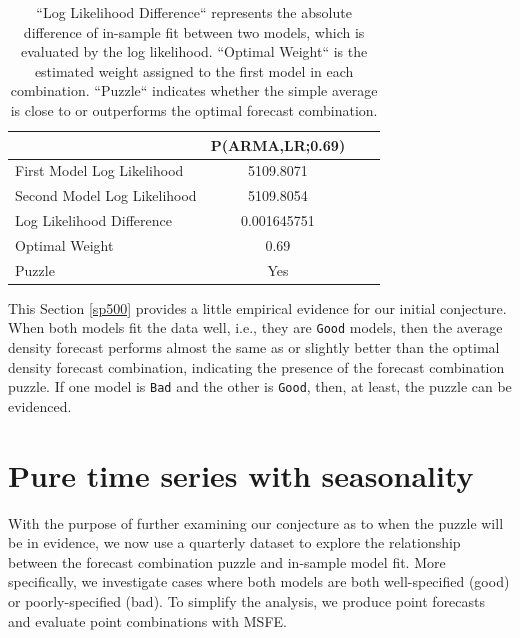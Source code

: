 \documentclass{monashthesis}
\begin{document}
\begin{table}[ht]
  \centering
    \begin{tabular}{l|ccc}
    \toprule
                                      &           P(ARMA,LR;0.69)  \\  
    \midrule
    First Model Log Likelihood        &               5109.8071               \\
    Second Model Log Likelihood       &               5109.8054               \\
    Log Likelihood Difference         &              0.001645751              \\
    Optimal Weight                    &                0.69                   \\
    Puzzle                            &                 Yes                   \\
    \bottomrule
    \end{tabular}
  \caption{``Log Likelihood Difference`` represents the absolute difference of in-sample fit between two models, which is evaluated by the log likelihood. ``Optimal Weight`` is the estimated weight assigned to the first model in each combination. ``Puzzle`` indicates whether the simple average is close to or outperforms the optimal forecast combination.}
  \label{tab:statfit}
\end{table}

This Section \ref{sp500} provides a little empirical evidence for our initial conjecture. When both models fit the data well, i.e., they are \texttt{Good} models, then the average density forecast performs almost the same as or slightly better than the optimal density forecast combination, indicating the presence of the forecast combination puzzle. If one model is \texttt{Bad} and the other is \texttt{Good}, then, at least, the puzzle can be evidenced.

\hypertarget{pure-time-series-with-seasonality}{%
\section{Pure time series with seasonality}\label{pure-time-series-with-seasonality}}

With the purpose of further examining our conjecture as to when the puzzle will be in evidence, we now use a quarterly dataset to explore the relationship between the forecast combination puzzle and in-sample model fit. More specifically, we investigate cases where both models are both well-specified (good) or poorly-specified (bad). To simplify the analysis, we produce point forecasts and evaluate point combinations with MSFE.
\end{document}
